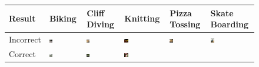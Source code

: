 \begin{figure}[t]
    \centering
    \begin{tabu} to \textwidth {|X[c,m]|X[c,m]X[c,m]X[c,m]X[c,m]X[c,m]|}
        \hline
        Result & Biking & Cliff Diving & Knitting & Pizza Tossing & Skate Boarding \\ \hline \hline
        Incorrect & 
        \includegraphics[width=0.1\textwidth]{images/rep/F_10.png}\vspace{2mm} & %
        \includegraphics[width=0.1\textwidth]{images/rep/F_21.png}\vspace{2mm} &
        \includegraphics[width=0.1\textwidth]{images/rep/F_49.png}\vspace{2mm} & 
        \includegraphics[width=0.1\textwidth]{images/rep/F_57.png}\vspace{2mm} &
        \includegraphics[width=0.1\textwidth]{images/rep/F_79.png}\vspace{2mm} \\
        Correct & 
        \includegraphics[width=0.1\textwidth]{images/rep/R_10.png} &
        \includegraphics[width=0.1\textwidth]{images/rep/R_21.png} &
        \includegraphics[width=0.1\textwidth]{images/rep/R_49.png} & 

\end{tabu}
\end{figure}
